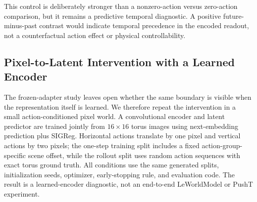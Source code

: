 \documentclass{article}
\begin{document}
This control is deliberately stronger than a nonzero-action versus zero-action
comparison, but it remains a predictive temporal diagnostic. A positive
future-minus-past contrast would indicate temporal precedence in the encoded
readout, not a counterfactual action effect or physical controllability.

\subsection{Pixel-to-Latent Intervention with a Learned Encoder}
\label{sec:supp-pixel-intervention}

The frozen-adapter study leaves open whether the same boundary is visible when
the representation itself is learned. We therefore repeat the intervention in
a small action-conditioned pixel world. A convolutional encoder and latent
predictor are trained jointly from $16\times16$ torus images using
next-embedding prediction plus SIGReg. Horizontal actions translate by one
pixel and vertical actions by two pixels; the one-step training split includes
a fixed action-group-specific scene offset, while the rollout split uses
random action sequences with exact torus ground truth. All conditions use the
same generated splits, initialization seeds, optimizer, early-stopping rule,
and evaluation code. The result is a learned-encoder diagnostic, not an
end-to-end LeWorldModel or PushT experiment.

\begin{table}[H]
\centering
\small
\setlength{\tabcolsep}{3pt}
\caption{Pixel-to-latent alignment intervention in a synthetic torus world.
The encoder and action-conditioned predictor are trained jointly; entries are
means over three seeds. One-step and $h=8$ rollout MSE are held-out latent
prediction errors, and composition error averages the 16 ordered two-action
products. The two commutators are diagnostics of the learned latent geometry,
not task-performance measures.}
\label{tab:supp-pixel-intervention}
\end{table}
\end{document}
